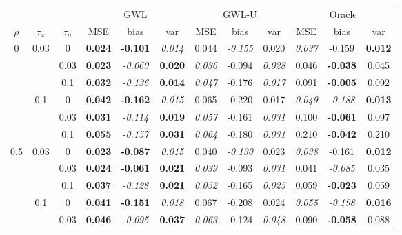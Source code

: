 \documentclass[authoryear, review, 11pt]{elsarticle}
\begin{document}
		\begin{table}[ht]
		\begin{center}
		\begin{tabular}{ccc | ccc | ccc | ccc }
		&&&\multicolumn{3}{c}{GWL}&\multicolumn{3}{c}{GWL-U}&\multicolumn{3}{c}{Oracle}\\
		$\rho$ & $\tau_x$ & $\tau_\sigma$ & MSE & bias & var &  MSE & bias & var &  MSE & bias & var\\   \hline
		\multirow{6}{*}{0} & \multirow{3}{*}{0.03} & 0 & \textbf{0.024} & \textbf{-0.101} & \emph{0.014} & 0.044 & \emph{-0.155} & 0.020 & \emph{0.037} & -0.159 & \textbf{0.012} \\ 
		 &  & 0.03 &   \textbf{0.023} & \emph{-0.060} & \textbf{0.020} & \emph{0.036} & -0.094 & \emph{0.028} & 0.046 & \textbf{-0.038} & 0.045 \\ 
		 &  & 0.1 &   \textbf{0.032} & \emph{-0.136} & \textbf{0.014} & \emph{0.047} & -0.176 & \emph{0.017} & 0.091 & \textbf{-0.005} & 0.092 \\ \cline{2-12}
		 & \multirow{3}{*}{0.1} & 0 &   \textbf{0.042} & \textbf{-0.162} & \emph{0.015} & 0.065 & -0.220 & 0.017 & \emph{0.049} & \emph{-0.188} & \textbf{0.013} \\ 
		 &  & 0.03 &   \textbf{0.031} & \emph{-0.114} & \textbf{0.019} & \emph{0.057} & -0.161 & \emph{0.031} & 0.100 & \textbf{-0.061} & 0.097 \\ 
		 &  & 0.1 &   \textbf{0.055} & \emph{-0.157} & \textbf{0.031} & \emph{0.064} & -0.180 & \emph{0.031} & 0.210 & \textbf{-0.042} & 0.210 \\ \cline{1-12}
		\multirow{6}{*}{0.5} & \multirow{3}{*}{0.03} & 0 &   \textbf{0.023} & \textbf{-0.087} & \emph{0.015} & 0.040 & \emph{-0.130} & 0.023 & \emph{0.038} & -0.161 & \textbf{0.012} \\ 
		 &  & 0.03 &   \textbf{0.024} & \textbf{-0.061} & \textbf{0.021} & \emph{0.039} & -0.093 & \emph{0.031} & 0.041 & \emph{-0.085} & 0.035 \\ 
		 &  & 0.1 &   \textbf{0.037} & \emph{-0.128} & \textbf{0.021} & \emph{0.052} & -0.165 & \emph{0.025} & 0.059 & \textbf{-0.023} & 0.059 \\ \cline{2-12}
		 & \multirow{3}{*}{0.1} & 0 &   \textbf{0.041} & \textbf{-0.151} & \emph{0.018} & 0.067 & -0.208 & 0.024 & \emph{0.055} & \emph{-0.198} & \textbf{0.016} \\ 
		 &  & 0.03 &   \textbf{0.046} & \emph{-0.095} & \textbf{0.037} & \emph{0.063} & -0.124 & \emph{0.048} & 0.090 & \textbf{-0.058} & 0.088 \\ 

\end{tabular}
\end{center}
\end{table}
\end{document}
